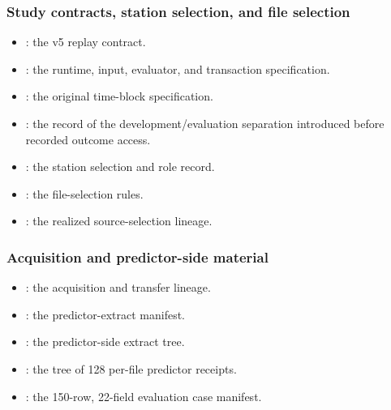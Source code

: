 \subsubsection{Study contracts, station selection, and file selection}
\begin{itemize}
\item {}:
the v5 replay contract.
\item {}:
the runtime, input, evaluator, and transaction specification.
\item {}:
the original time-block specification.
\item {}:
the record of the development/evaluation separation introduced before recorded outcome access.
\item {}:
the station selection and role record.
\item {}:
the file-selection rules.
\item {}:
the realized source-selection lineage.
\end{itemize}

\subsubsection{Acquisition and predictor-side material}
\begin{itemize}
\item {}:
the acquisition and transfer lineage.
\item {}:
the predictor-extract manifest.
\item {}:
the predictor-side extract tree.
\item {}:
the tree of 128 per-file predictor receipts.
\item {}:
the 150-row, 22-field evaluation case manifest.
\end{itemize}

